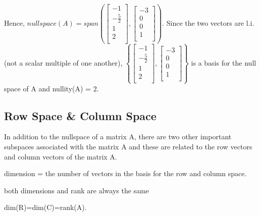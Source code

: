 \documentclass{extarticle}
\begin{document}
\begin{tcolorbox}[enhanced jigsaw,sharp corners,coltext=black,colback=BurntOrange!25!white,boxrule=0pt,breakable,size=minimal]

Hence, $null space(A) = span \left( \left[ \begin{matrix} -1\\-\frac{5}{2}\\1\\2\\\end{matrix} \right], \left[ \begin{matrix} -3\\0\\0\\1\\ \end{matrix} \right] \right)$. Since the two vectors are l.i. (not a scalar multiple of one another), $\left\{ \left[ \begin{matrix} -1\\-\frac{5}{2}\\1\\2\\\end{matrix} \right], \left[ \begin{matrix} -3\\0\\0\\1\\ \end{matrix} \right] \right\}$ is a basis for the null space of A and nullity(A) = 2.


\end{tcolorbox}

\begin{tcolorbox}[enhanced jigsaw,sharp corners,coltext=black,colback=BurntOrange!25!white,boxrule=0pt,breakable,size=minimal]

\subsection{Row Space \& Column Space}
In addition to the nullspace of a matrix A, there are two other important subspaces associated with the matrix A and these are related to the row vectors and column vectors of the matrix A.



dimension = the number of vectors in the basis for the row and column space.

both dimensions and rank are always the same

dim(R)=dim(C)=rank(A).\end{tcolorbox}
\end{document}
